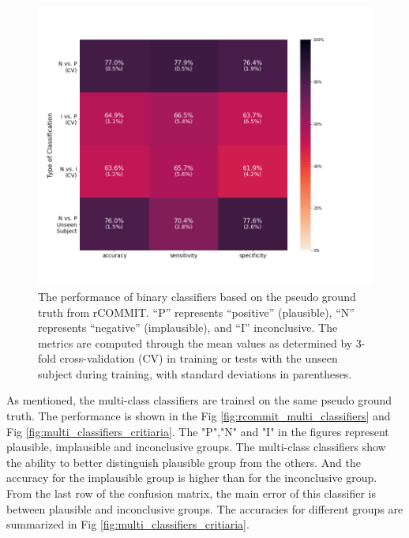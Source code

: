 \begin{figure}[ht]
    \centering
    \includegraphics[width= 12cm]{figures/rcommit_classifiers.png}
    \caption{The performance of binary classifiers based on the pseudo ground truth from rCOMMIT.
    “P” represents “positive” (plausible),  “N” represents “negative” (implausible), and “I” inconclusive. 
    The metrics are computed through the mean values as determined by 3-fold cross-validation (CV) in training or tests with the unseen subject during training, 
    with standard deviations in parentheses.}
\label{fig:rcommit_classifiers}
\end{figure}

As mentioned, the multi-class classifiers are trained on the same pseudo ground truth.
The performance is shown in the Fig \ref{fig:rcommit_multi_classifiers} and Fig \ref{fig:multi_classifiers_critiaria}.
The "P","N" and "I" in the figures represent plausible, implausible and inconclusive groups.
The multi-class classifiers show the ability to better distinguish plausible group from the others.
And the accuracy for the implausible group is higher than for the inconclusive group. 
From the last row of the confusion matrix, the main error of this classifier is between plausible and inconclusive groups.
The accuracies for different groups are summarized in Fig \ref{fig:multi_classifiers_critiaria}.

